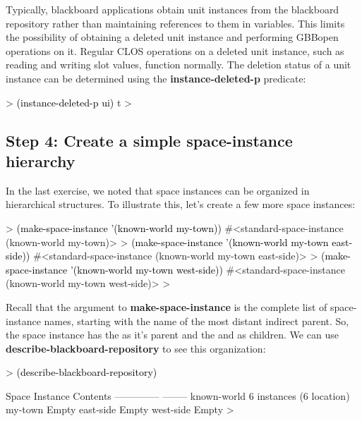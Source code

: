\documentclass[10pt,twoside,english,pdftex]{article}
\begin{document}
%
Typically, blackboard applications obtain unit instances from the blackboard
repository rather than maintaining references to them in variables.  This
limits the possibility of obtaining a deleted unit instance and performing
GBBopen operations on it.  Regular CLOS operations on a deleted unit instance,
such as reading and writing slot values, function normally.  The deletion
status of a unit instance can be determined using the
\textbf{instance-deleted-p} predicate:
%
\begin{example}\color{darkergray}%
  > \textcolor{black}{(instance-deleted-p ui)}
  t
  >
\end{example}

\subsection*{Step 4: Create a simple space-instance hierarchy}

%
%
In the last exercise, we noted that space instances can be organized in
hierarchical structures.  To illustrate this, let's create a few more space
instances:
%
\begin{example}\color{darkergray}%
  > \textcolor{black}{(make-space-instance '(known-world my-town))}
  #<standard-space-instance (known-world my-town)>
  > \textcolor{black}{(make-space-instance '(known-world my-town east-side))}
  #<standard-space-instance (known-world my-town east-side)>
  > \textcolor{black}{(make-space-instance '(known-world my-town west-side))}
  #<standard-space-instance (known-world my-town west-side)>
  >
\end{example}

%
Recall that the  argument to
\textbf{make-space-instance} is the complete list of space-instance names,
starting with the name of the most distant indirect parent.  So, the
 space instance has the  as it's parent and
the  and  as children.  We can use
\textbf{describe-blackboard-repository} to see this organization:
%
\begin{example}\color{darkergray}%
  > \textcolor{black}{(describe-blackboard-repository)}

  Space Instance                Contents
  --------------                --------
  known-world                   6 instances (6 location)
     my-town                    Empty
        east-side               Empty
        west-side               Empty
  >
\end{example}
\end{document}
